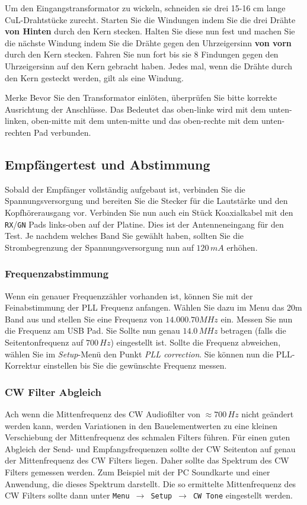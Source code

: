 \documentclass[10pt, a4paper,twoside]{scrartcl}
\newenvironment{remember}{\begin{bclogo}[couleur=blue!30,arrondi=.1,logo=\bccrayon,ombre=true]{Merke}}{\end{bclogo}}
\begin{document}
Um den Eingangstransformator zu wickeln, schneiden sie drei 15-16 cm lange CuL-Drahtstücke zurecht. Starten Sie die Windungen indem Sie die drei Drähte \textbf{von Hinten} durch den Kern stecken. Halten Sie diese nun fest und machen Sie die nächste Windung indem Sie die Drähte gegen den Uhrzeigersinn \textbf{von vorn} durch den Kern stecken. Fahren Sie nun fort bis sie 8 Findungen gegen den Uhrzeigersinn auf den Kern gebracht haben. Jedes mal, wenn die Drähte durch den Kern gesteckt werden, gilt als eine Windung.

\begin{remember}
Bevor Sie den Transformator einlöten, überprüfen Sie bitte korrekte Ausrichtung der Anschlüsse. Das Bedeutet das oben-linke wird mit dem unten-linken, oben-mitte mit dem unten-mitte und das oben-rechte mit dem unten-rechten Pad verbunden.
\end{remember}

\subsection{Empfängertest und Abstimmung}
Sobald der Empfänger vollständig aufgebaut ist, verbinden Sie die Spannungsversorgung und bereiten Sie die Stecker für die Lautstärke und den Kopfhörerausgang vor. Verbinden Sie nun auch ein Stück Koaxialkabel mit den \texttt{RX}/\texttt{GN} Pads links-oben auf der Platine. Dies ist der Antenneneingang für den Test. Je nachdem welches Band Sie gewählt haben, sollten Sie die Strombegrenzung der Spannungsversorgung nun auf $120\,mA$ erhöhen.

\subsubsection{Frequenzabstimmung}
Wenn ein genauer Frequenzzähler vorhanden ist, können Sie mit der Feinabstimmung der PLL Frequenz anfangen. Wählen Sie dazu im Menu das 20m Band aus und stellen Sie eine Frequenz von $14.000.70 MHz$ ein. Messen Sie nun die Frequenz am USB Pad. Sie Sollte nun genau $14.0\,MHz$ betragen (falls die Seitentonfrequenz auf $700\,Hz$) eingestellt ist. Sollte die Frequenz abweichen, wählen Sie im \emph{Setup}-Menü den Punkt \emph{PLL correction}. Sie können nun die PLL-Korrektur einstellen bis Sie die gewünschte Frequenz messen.

\subsubsection{CW Filter Abgleich}
Ach wenn die Mittenfrequenz des CW Audiofilter von $\approx 700\,Hz$ nicht geändert werden kann, werden Variationen in den Bauelementwerten zu eine kleinen Verschiebung der Mittenfrequenz des schmalen Filters führen. Für einen guten Abgleich der Send- und Empfangsfrequenzen sollte der CW Seitenton auf genau der Mittenfrequenz des CW Filters liegen. Daher sollte das Spektrum des CW Filters gemessen werden. Zum Beispiel mit der PC Soundkarte und einer Anwendung, die dieses Spektrum darstellt. Die so ermittelte Mittenfrequenz des CW Filters sollte dann unter \texttt{Menu}\ $\rightarrow$\ \texttt{Setup}\ $\rightarrow$\ \texttt{CW Tone} eingestellt werden.
\end{document}

